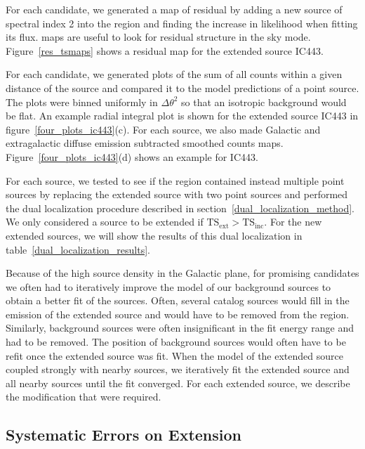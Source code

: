 \documentclass[12pt,preprint]{aastex}
\newcommand{\tsext}{{\ensuremath{\text{TS}_{\text{ext}}}}\xspace}
\newcommand{\tsinc}{\ensuremath{\text{TS}_{\text{inc}}}\xspace}
\newcommand{\ts}{\text{TS}\xspace}
\begin{document}
For each candidate, we generated a map of residual \ts
by adding a new source of spectral index 2 into the region and finding
the increase in likelihood when fitting its flux. \ts maps are useful
to look for residual structure in the sky mode.  Figure~\ref{res_tsmaps}
shows a residual \ts map for the extended source IC443.

For each candidate, we generated plots of the sum of all counts
within a given distance of the source and compared it to the model
predictions of a point source.  The plots were binned uniformly
in $\Delta \theta^2$ so that an isotropic background would be flat.
An example radial integral plot is shown for the extended source IC443
in figure~\ref{four_plots_ic443}(c).  For each source, we also made
Galactic and extragalactic diffuse emission subtracted smoothed counts
maps. Figure~\ref{four_plots_ic443}(d) shows an example for IC443. 

For each source, we tested to see if the region contained instead
multiple point sources by replacing the extended source with
two point sources and performed the dual localization procedure
described in section~\ref{dual_localization_method}.  We only
considered a source to be extended if $\tsext>\tsinc$.  For the new
extended sources, we will show the results of this dual localization in
table~\ref{dual_localization_results}.

Because of the high source density in the Galactic plane, for promising
candidates we often had to iteratively improve the model of our background
sources to obtain a better fit of the sources.  Often, several catalog
sources would fill in the emission of the extended source and would
have to be removed from the region.  Similarly, background sources
were often insignificant in the fit energy range and had to be removed.
The position of background sources would often have to be refit once the
extended source was fit.  When the model of the extended source coupled
strongly with nearby sources, we iteratively fit the extended source and
all nearby sources until the fit converged.  For each extended source,
we describe the modification that were required.

\subsection{Systematic Errors on Extension}
\label{systematic_errors_on_extension}

\end{document}
